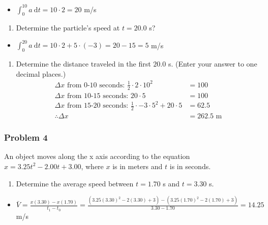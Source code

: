 \documentclass[
  letterpaper,
  DIV=11,
  numbers=noendperiod]{scrartcl}
\providecommand{\tightlist}{%
  \setlength{\itemsep}{0pt}\setlength{\parskip}{0pt}}\usepackage{longtable,booktabs,array}
\begin{document}
\begin{itemize}
\tightlist
\item
  \(\int_0^{10} a \ \mathrm{d}t = 10 \cdot 2 = 20\) m/s
\end{itemize}

\begin{enumerate}
\def\labelenumi{(\alph{enumi})}
\setcounter{enumi}{1}
\tightlist
\item
  Determine the particle's speed at \(t = 20.0\) s?
\end{enumerate}

\begin{itemize}
\tightlist
\item
  \(\int_0^{20} a \ \mathrm{d}t = 10 \cdot 2 + 5 \cdot (-3) = 20 - 15 = 5\)
  m/s
\end{itemize}

\begin{enumerate}
\def\labelenumi{(\alph{enumi})}
\setcounter{enumi}{2}
\tightlist
\item
  Determine the distance traveled in the first \(20.0\) s. (Enter your
  answer to one decimal places.) \begin{align*}
  \Delta x \text{ from 0-10 seconds: }\frac{1}{2} \cdot 2 \cdot 10^2 &= 100 \\
  \Delta x \text{ from 10-15 seconds: }20 \cdot 5 &= 100 \\
  \Delta x \text{ from 15-20 seconds: } \frac{1}{2} \cdot -3 \cdot 5^2 + 20 \cdot 5 &= 62.5 \\
  \therefore \Delta x &= 262.5 \text{ m}
  \end{align*}
\end{enumerate}

\hypertarget{problem-4-2}{%
\subsubsection{Problem 4}\label{problem-4-2}}

An object moves along the x axis according to the equation
\(x = 3.25t^2 − 2.00t + 3.00\), where \(x\) is in meters and \(t\) is in
seconds.

\begin{enumerate}
\def\labelenumi{(\alph{enumi})}
\tightlist
\item
  Determine the average speed between \(t = 1.70\) s and \(t = 3.30\) s.
\end{enumerate}

\begin{itemize}
\tightlist
\item
  \(\bar{V} = \frac{x(3.30)-x(1.70)}{t_1-t_0} = \frac{(3.25(3.30)^2-2(3.30)+3) - (3.25(1.70)^2-2(1.70)+3)}{3.30-1.70} = 14.25\)
  m/s
\end{itemize}
\end{document}
